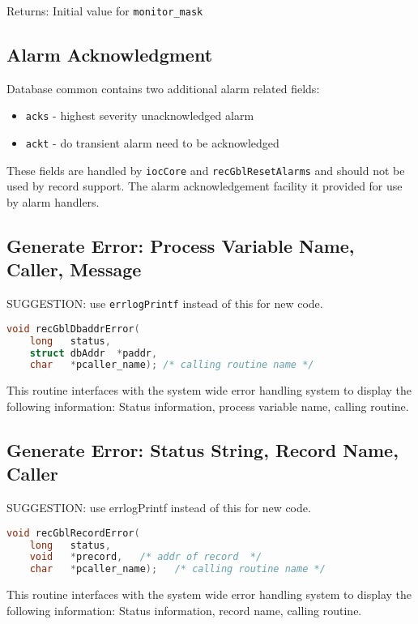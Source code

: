 Returns: Initial value for \verb|monitor_mask|

\subsection{Alarm Acknowledgment}

Database common contains two additional alarm related fields:

\begin{itemize}
\item \verb|acks| - highest severity unacknowledged alarm
\item \verb|ackt| - do transient alarm need to be acknowledged
\end{itemize}

These fields are handled by \verb|iocCore| and \verb|recGblResetAlarms| and should not be used by record support.
The alarm acknowledgement facility it provided for use by alarm handlers.

\subsection{Generate Error: Process Variable Name, Caller, Message}

SUGGESTION: use \verb|errlogPrintf| instead of this for new code.

\begin{lstlisting}[language=C]
void recGblDbaddrError(
    long   status,
    struct dbAddr  *paddr,
    char   *pcaller_name); /* calling routine name */
\end{lstlisting}

This routine interfaces with the system wide error handling system to display the following information:
Status information, process variable name, calling routine.

\subsection{Generate Error: Status String, Record Name, Caller}
SUGGESTION: use errlogPrintf instead of this for new code.
\begin{lstlisting}[language=C]
void recGblRecordError(
    long   status,
    void   *precord,   /* addr of record  */
    char   *pcaller_name);   /* calling routine name */
\end{lstlisting}

This routine interfaces with the system wide error handling system to display the following information:
Status information, record name, calling routine.

